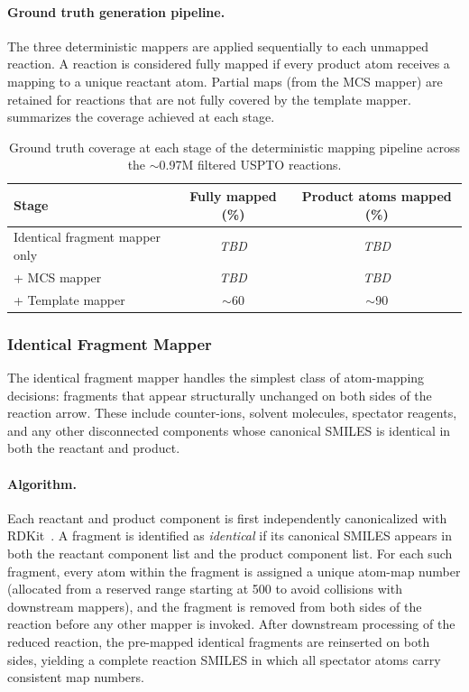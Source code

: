 \documentclass[12pt]{article}
\begin{document}
\paragraph{Ground truth generation pipeline.}
The three deterministic mappers are applied sequentially to each
unmapped reaction.  A reaction is considered fully mapped if every
product atom receives a mapping to a unique reactant atom.  Partial
maps (from the MCS mapper) are retained for reactions that are not
fully covered by the template mapper.  
summarizes the coverage achieved at each stage.

\begin{table}[htbp]
  \centering
  \caption{Ground truth coverage at each stage of the deterministic
    mapping pipeline across the $\sim$0.97M filtered USPTO reactions.}
  \label{tab:gt_coverage}
  \begin{tabular}{lcc}
    \toprule
    \textbf{Stage}                 & \textbf{Fully mapped (\%)} & \textbf{Product atoms mapped (\%)} \\
    \midrule
    Identical fragment mapper only & \textit{TBD}               & \textit{TBD}                       \\
    + MCS mapper                   & \textit{TBD}               & \textit{TBD}                       \\
    + Template mapper              & $\sim$60                   & $\sim$90                           \\
    \bottomrule
  \end{tabular}
\end{table}

\subsubsection{Identical Fragment Mapper}
\label{subsubsec:identical_fragment}

The identical fragment mapper handles the simplest class of atom-mapping
decisions: fragments that appear structurally unchanged on both sides of the
reaction arrow.  These include counter-ions, solvent molecules, spectator
reagents, and any other disconnected components whose canonical SMILES is
identical in both the reactant and product.

\paragraph{Algorithm.}
Each reactant and product component is first independently canonicalized with
RDKit~\cite{RDKit}.  A fragment is identified as \emph{identical} if its canonical SMILES
appears in both the reactant component list and the product component list.  For
each such fragment, every atom within the fragment is assigned a unique atom-map number (allocated
from a reserved range starting at 500 to avoid collisions with downstream
mappers), and the fragment is removed from both sides of the reaction before any
other mapper is invoked.  After downstream processing of the reduced reaction,
the pre-mapped identical fragments are reinserted on both sides, yielding a
complete reaction SMILES in which all spectator atoms carry consistent map
numbers.
\end{document}
